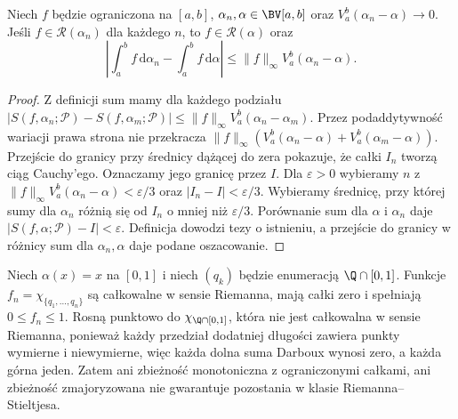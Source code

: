 \begin{twierdzenie}\label{ma1:kh:thm:rs-integrator-limit}
Niech $f$ będzie ograniczona na $[a,b]$, $\alpha_n,\alpha\in\BV[a,b]$ oraz $V_a^b(\alpha_n-\alpha)\to0$. Jeśli $f\in\mathcal R(\alpha_n)$ dla każdego $n$, to $f\in\mathcal R(\alpha)$ oraz
\[
 \left|\int_a^b f\,\mathrm d\alpha_n-\int_a^b f\,\mathrm d\alpha\right|
 \le\|f\|_\infty V_a^b(\alpha_n-\alpha).
\]
\end{twierdzenie}
\begin{proof}
Z definicji sum mamy dla każdego podziału
$|S(f,\alpha_n;\mathcal P)-S(f,\alpha_m;\mathcal P)|\le
\|f\|_\infty V_a^b(\alpha_n-\alpha_m)$.
Przez podaddytywność wariacji prawa strona nie przekracza
$\|f\|_\infty(V_a^b(\alpha_n-\alpha)+V_a^b(\alpha_m-\alpha))$.
Przejście do granicy przy średnicy dążącej do zera pokazuje, że całki $I_n$ tworzą ciąg Cauchy'ego. Oznaczamy jego granicę przez $I$. Dla $\varepsilon>0$ wybieramy $n$ z $\|f\|_\infty V_a^b(\alpha_n-\alpha)<\varepsilon/3$ oraz $|I_n-I|<\varepsilon/3$. Wybieramy średnicę, przy której sumy dla $\alpha_n$ różnią się od $I_n$ o mniej niż $\varepsilon/3$. Porównanie sum dla $\alpha$ i $\alpha_n$ daje $|S(f,\alpha;\mathcal P)-I|<\varepsilon$. Definicja dowodzi tezy o istnieniu, a przejście do granicy w różnicy sum dla $\alpha_n,\alpha$ daje podane oszacowanie.
\end{proof}

\begin{przyklad}\label{ma1:kh:ex:rs-dominated-failure}
Niech $\alpha(x)=x$ na $[0,1]$ i niech $(q_k)$ będzie enumeracją $\Q\cap[0,1]$. Funkcje $f_n=\chi_{\{q_1,\ldots,q_n\}}$ są całkowalne w sensie Riemanna, mają całki zero i spełniają $0\le f_n\le1$. Rosną punktowo do $\chi_{\Q\cap[0,1]}$, która nie jest całkowalna w sensie Riemanna, ponieważ każdy przedział dodatniej długości zawiera punkty wymierne i niewymierne, więc każda dolna suma Darboux wynosi zero, a każda górna jeden. Zatem ani zbieżność monotoniczna z ograniczonymi całkami, ani zbieżność zmajoryzowana nie gwarantuje pozostania w klasie Riemanna--Stieltjesa.
\end{przyklad}
